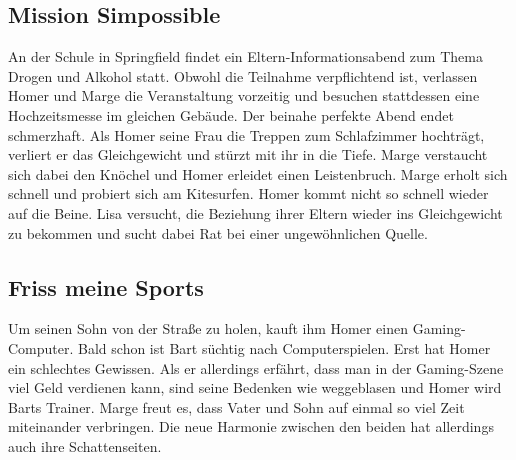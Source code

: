
\subsection{Mission Simpossible}\label{YABF08}
An der Schule in Springfield findet ein Eltern-Informationsabend zum Thema Drogen und Alkohol statt. Obwohl die Teilnahme verpflichtend ist, verlassen Homer und Marge die Veranstaltung vorzeitig und besuchen stattdessen eine Hochzeitsmesse im gleichen Gebäude. Der beinahe perfekte Abend endet schmerzhaft. Als Homer seine Frau die Treppen zum Schlafzimmer hochträgt, verliert er das Gleichgewicht und stürzt mit ihr in die Tiefe. Marge verstaucht sich dabei den Knöchel und Homer erleidet einen Leistenbruch. Marge erholt sich schnell und probiert sich am Kitesurfen. Homer kommt nicht so schnell wieder auf die Beine. Lisa versucht, die Beziehung ihrer Eltern wieder ins Gleichgewicht zu bekommen und sucht dabei Rat bei einer ungewöhnlichen Quelle.


\subsection{Friss meine Sports}
Um seinen Sohn von der Straße zu holen, kauft ihm Homer einen Gaming-Computer. Bald schon ist Bart süchtig nach Computerspielen. Erst hat Homer ein schlechtes Gewissen. Als er allerdings erfährt, dass man in der Gaming-Szene viel Geld verdienen kann, sind seine Bedenken wie weggeblasen und Homer wird Barts Trainer. Marge freut es, dass Vater und Sohn auf einmal so viel Zeit miteinander verbringen. Die neue Harmonie zwischen den beiden hat allerdings auch ihre Schattenseiten. 

